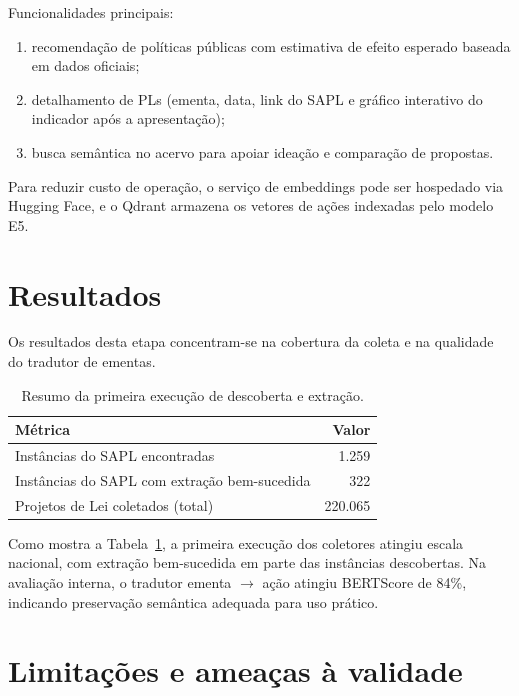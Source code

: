 \documentclass[10pt,a4paper]{article}
\begin{document}
Funcionalidades principais:
\begin{enumerate}[leftmargin=*]
  \item recomendação de políticas públicas com estimativa de efeito esperado baseada em dados oficiais;
  \item detalhamento de PLs (ementa, data, link do SAPL e gráfico interativo do indicador após a apresentação);
  \item busca semântica no acervo para apoiar ideação e comparação de propostas.
\end{enumerate}

Para reduzir custo de operação, o serviço de embeddings pode ser hospedado via Hugging Face, e o Qdrant armazena os vetores de ações indexadas pelo modelo E5.

\section{Resultados}

Os resultados desta etapa concentram-se na cobertura da coleta e na qualidade do tradutor de ementas.

\begin{table}[H]
\centering
\caption{Resumo da primeira execução de descoberta e extração.}
\label{tab:coleta}
\begin{tabular}{l r}
\toprule
Métrica & Valor \\
\midrule
Instâncias do SAPL encontradas & 1.259 \\
Instâncias do SAPL com extração bem-sucedida & 322 \\
Projetos de Lei coletados (total) & 220.065 \\
\bottomrule
\end{tabular}
\end{table}

Como mostra a Tabela~\ref{tab:coleta}, a primeira execução dos coletores atingiu escala nacional, com extração bem-sucedida em parte das instâncias descobertas. Na avaliação interna, o tradutor ementa $\rightarrow$ ação atingiu BERTScore de 84\%, indicando preservação semântica adequada para uso prático.

\section{Limitações e ameaças à validade}
\end{document}
